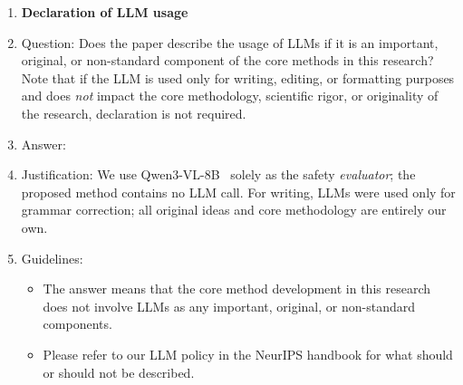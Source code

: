 \begin{enumerate}
\item {\bf Declaration of LLM usage}
    \item[] Question: Does the paper describe the usage of LLMs if it is an important, original, or non-standard component of the core methods in this research? Note that if the LLM is used only for writing, editing, or formatting purposes and does \emph{not} impact the core methodology, scientific rigor, or originality of the research, declaration is not required.
    \item[] Answer: \answerYes{}
    \item[] Justification: We use Qwen3-VL-8B~\citep{bai2025qwen3} solely as the safety \emph{evaluator}; the proposed method contains no LLM call. For writing, LLMs were used only for grammar correction; all original ideas and core methodology are entirely our own.
    \item[] Guidelines:
    \begin{itemize}
        \item The answer \answerNA{} means that the core method development in this research does not involve LLMs as any important, original, or non-standard components.
        \item Please refer to our LLM policy in the NeurIPS handbook for what should or should not be described.
    \end{itemize}

\end{enumerate}
